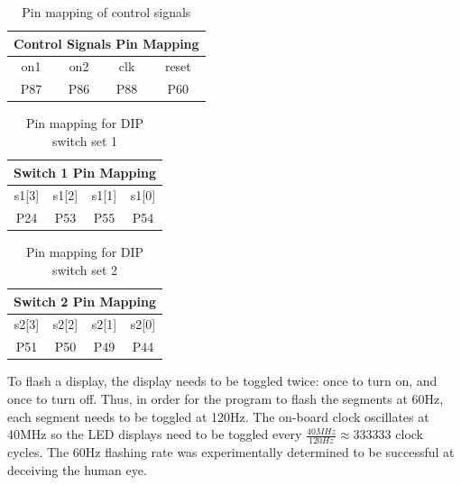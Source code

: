\documentclass[11pt]{article}
\begin{document}
\begin{table}[h]
\centering
\begin{tabular}{|c|c|c|c|}
\hline
\multicolumn{4}{|c|}{\textbf{Control Signals Pin Mapping}} \\ \hline
on1        & on2        & clk        & reset       \\ \hline
P87        & P86        & P88        & P60         \\ \hline
\end{tabular}
\caption{Pin mapping of control signals}
\label{table:pinmap_control}
\end{table}


\begin{table}[h]
\centering
\begin{tabular}{|c|c|c|c|}
\hline
\multicolumn{4}{|c|}{\textbf{Switch 1 Pin Mapping}} \\ \hline
s1{[}3{]}  & s1{[}2{]}  & s1{[}1{]} & s1{[}0{]} \\ \hline
P24        & P53        & P55       & P54       \\ \hline
\end{tabular}
\caption{Pin mapping for DIP switch set 1}
\label{table:pinmap_sw1}
\end{table}


\begin{table}[h]
\centering
\begin{tabular}{|c|c|c|c|}
\hline
\multicolumn{4}{|c|}{\textbf{Switch 2 Pin Mapping}} \\ \hline
s2{[}3{]}  & s2{[}2{]}  & s2{[}1{]} & s2{[}0{]} \\ \hline
P51        & P50        & P49       & P44       \\ \hline
\end{tabular}
\caption{Pin mapping for DIP switch set 2}
\label{table:pinmap_sw2}
\end{table}



To flash a display, the display needs to be toggled twice: once to turn on, and once to turn off. Thus, in order for the program to flash the segments at 60Hz, each segment needs to be toggled at 120Hz. The on-board clock oscillates at 40MHz so the LED displays need to be toggled every $\frac{40MHz}{120Hz} \approx 333333$ clock cycles. The 60Hz flashing rate was experimentally determined to be successful at deceiving the human eye.


\label{sec:software_LEDbar}

\clearpage
\end{document}
